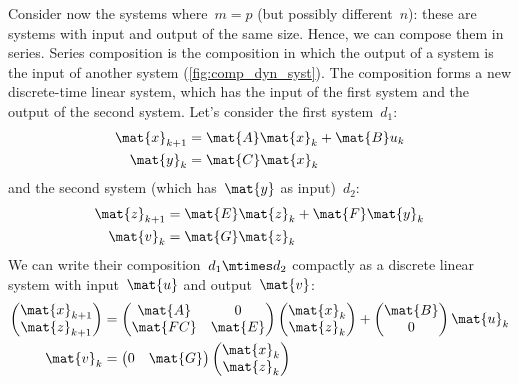 Consider now the systems where~$m=p$ (but possibly different~$n$): these are systems with input and output of the same size.
Hence, we can compose them in series.
Series composition is the composition in which the output of a system is the input of another system (\cref{fig:comp_dyn_syst}).
The composition forms a new discrete-time linear system, which has the input of the first system and the output of the second system.
Let's consider the first system~$d_1$:
\begin{equation*}
    \label{eq:dlin-1}
    \begin{aligned}
        \mat{x}_{k+1} &= \mat{A} \mat{x}_k + \mat{B} u_k \\
        \mat{y}_{k}   &= \mat{C} \mat{x}_k
    \end{aligned}
\end{equation*}
and the second system (which has~$\mat{y}$ as input)~$d_2$:
\begin{equation*}
    \label{eq:dlin-2}
    \begin{aligned}
        \mat{z}_{k+1} &= \mat{E} \mat{z}_k + \mat{F} \mat{y}_k \\
        \mat{v}_{k}   &= \mat{G} \mat{z}_k
    \end{aligned}
\end{equation*}
We can write their composition~$d_1\mtimes d_2$ compactly as a discrete linear system with input~$\mat{u}$ and output~$\mat{v}$:
\begin{equation*}
    \label{eq:dlin-3}
    \begin{aligned}
        \begin{pmatrix}
            \mat{x}_{k+1}\\
            \mat{z}_{k+1}
        \end{pmatrix}&=
        \begin{pmatrix}
            \mat{A}&0\\
            \mat{FC}&\mat{E}
        \end{pmatrix}\begin{pmatrix}
                         \mat{x}_k\\ \mat{z}_k
        \end{pmatrix}+
        \begin{pmatrix}
            \mat{B}\\ 0
        \end{pmatrix}\mat{u}_k\\
        \mat{v}_k&=\begin{pmatrix}
                       0&\mat{G}
        \end{pmatrix} \begin{pmatrix}
                          \mat{x}_k \\ \mat{z}_k
        \end{pmatrix}
    \end{aligned}
\end{equation*}

